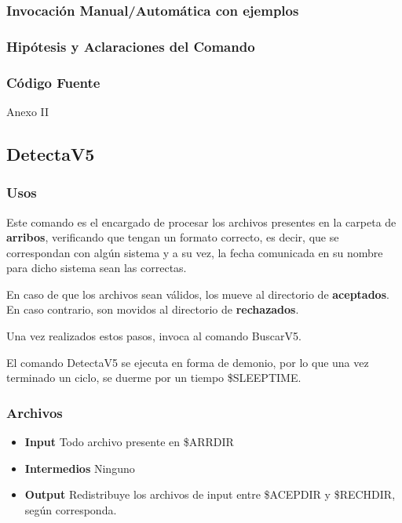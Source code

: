 \documentclass[a4paper,10pt,titlepage]{article}
\begin{document}
		\subsubsection{Invocaci\'on Manual/Autom\'atica con ejemplos}

		\subsubsection{Hip\'otesis y Aclaraciones del Comando}

		\subsubsection{C\'odigo Fuente}
			Anexo II


	\subsection{DetectaV5}
		\subsubsection{Usos}
		Este comando es el encargado de procesar los archivos presentes en la carpeta de \textbf{arribos}, verificando que tengan un formato correcto, es decir, que se correspondan con alg\'un sistema y a su vez, la fecha comunicada en su nombre para dicho sistema sean las correctas. 

	En caso de que los archivos sean v\'alidos, los mueve al directorio de \textbf{aceptados}. En caso contrario, son movidos al directorio de \textbf{rechazados}. 

		Una vez realizados estos pasos, invoca al comando BuscarV5.

		El comando DetectaV5 se ejecuta en forma de demonio, por lo que una vez terminado un ciclo, se duerme por un tiempo \$SLEEPTIME.			 

		\subsubsection{Archivos}
			\begin {itemize}
				\item \textbf{Input} {Todo archivo presente en \$ARRDIR }
				\item \textbf{Intermedios} {Ninguno}
				\item \textbf{Output} {Redistribuye los archivos de input entre \$ACEPDIR y \$RECHDIR, seg\'un corresponda.}
			\end{itemize}
\end{document}
